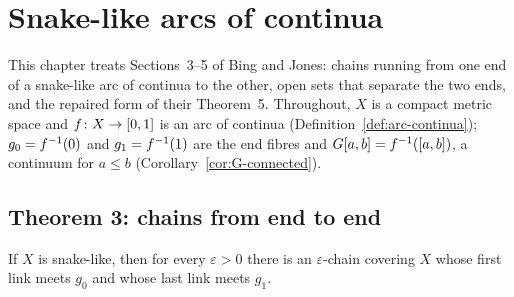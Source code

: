 \chapter{Snake-like arcs of continua}\label{ch:arcs}

This chapter treats Sections~3--5 of Bing and Jones: chains running from one end of a snake-like arc of continua to the other, open sets that separate the
two ends, and the repaired form of their Theorem~5. Throughout, $X$ is a compact metric space and $f\colon X\to[0,1]$ is an arc of continua
(Definition~\ref{def:arc-continua}); $g_0=f^{-1}(0)$ and $g_1=f^{-1}(1)$ are the end fibres and $G[a,b]=f^{-1}([a,b])$, a continuum for $a\le b$
(Corollary~\ref{cor:G-connected}).

\section{Theorem 3: chains from end to end}

\begin{theorem}\label{thm:bj3}
If $X$ is snake-like, then for every $\varepsilon>0$ there is an $\varepsilon$-chain covering $X$ whose first link meets $g_0$ and whose last link meets
$g_1$.
\end{theorem}

